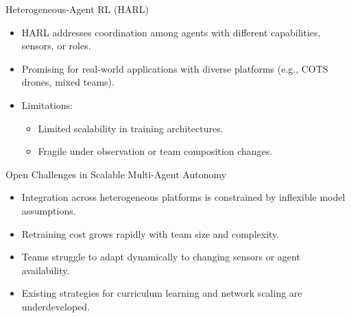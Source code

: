 \documentclass[xcolor={svgnames},aspectratio=169]{beamer}
\begin{document}
\begin{frame}{Heterogeneous-Agent RL (HARL)}
    \begin{itemize}
        \item HARL addresses coordination among agents with different capabilities, sensors, or roles.
        \item Promising for real-world applications with diverse platforms (e.g., COTS drones, mixed teams).
        \item Limitations:
        \begin{itemize}
            \item Limited scalability in training architectures.
            \item Fragile under observation or team composition changes.
        \end{itemize}
    \end{itemize}
\end{frame}

\begin{frame}{Open Challenges in Scalable Multi-Agent Autonomy}
    \begin{itemize}
        \item Integration across heterogeneous platforms is constrained by inflexible model assumptions.
        \item Retraining cost grows rapidly with team size and complexity.
        \item Teams struggle to adapt dynamically to changing sensors or agent availability.
        \item Existing strategies for curriculum learning and network scaling are underdeveloped.
    \end{itemize}
\end{frame}
\end{document}
